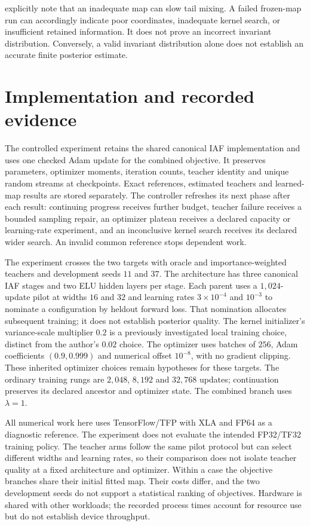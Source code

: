 \citet{hoffman2019neutra} explicitly note that an inadequate map can slow tail
mixing. A failed frozen-map run can accordingly indicate poor coordinates,
inadequate kernel search, or insufficient retained information. It does not
prove an incorrect invariant distribution. Conversely, a valid invariant
distribution alone does not establish an accurate finite posterior estimate.

\section[Implementation and evidence]{Implementation and recorded evidence}

The controlled experiment retains the shared canonical IAF implementation and
uses one checked Adam update for the combined objective. It preserves
parameters, optimizer moments, iteration counts, teacher identity and unique
random streams at checkpoints. Exact references, estimated teachers and
learned-map results are stored separately. The controller refreshes its next
phase after each result: continuing progress receives further budget,
teacher failure receives a bounded sampling repair, an optimizer plateau
receives a declared capacity or learning-rate experiment, and an inconclusive
kernel search receives its declared wider search. An invalid common reference
stops dependent work.

The experiment crosses the two targets with oracle and importance-weighted
teachers and development seeds $11$ and $37$. The architecture has three
canonical IAF stages and two ELU hidden layers per stage. Each parent uses a
$1{,}024$-update pilot at widths $16$ and $32$ and learning rates
$3\times10^{-4}$ and $10^{-3}$ to nominate a configuration by heldout forward
loss. That nomination allocates subsequent training; it does not establish
posterior quality. The kernel initializer's variance-scale multiplier $0.2$
is a previously investigated local training choice, distinct from the author's
$0.02$ choice. The optimizer
uses batches of $256$, Adam coefficients $(0.9,0.999)$ and numerical offset
$10^{-8}$, with no gradient clipping. These inherited optimizer choices remain
hypotheses for these targets. The ordinary training rungs are $2{,}048$,
$8{,}192$ and $32{,}768$ updates; continuation preserves its declared ancestor
and optimizer state. The combined branch uses $\lambda=1$.

All numerical work here uses TensorFlow/TFP with XLA and FP64 as a diagnostic
reference. The experiment does not evaluate the intended FP32/TF32 training
policy. The teacher arms follow the same pilot protocol but can select different
widths and learning rates, so their comparison does not isolate teacher quality
at a fixed architecture and optimizer. Within a case the objective branches
share their initial fitted map. Their costs differ, and the two development
seeds do not support a statistical ranking of objectives. Hardware is shared
with other workloads; the recorded process times account for resource use but
do not establish device throughput.


